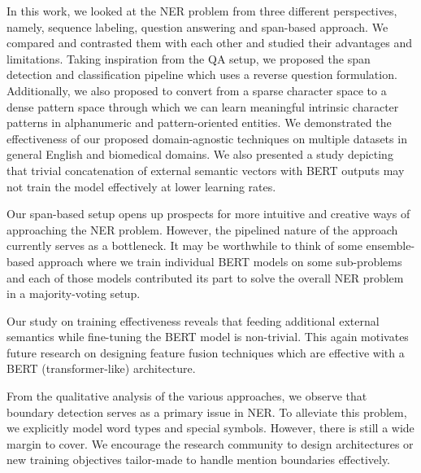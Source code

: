 In this work, we looked at the NER problem from three different perspectives, namely, sequence labeling, question answering and span-based approach. We compared and contrasted them with each other and studied their advantages and limitations. Taking inspiration from the QA setup, we proposed the span detection and classification pipeline which uses a reverse question formulation. Additionally, we also proposed to convert from a sparse character space to a dense pattern space through which we can learn meaningful intrinsic character patterns in alphanumeric and pattern-oriented entities. We demonstrated the effectiveness of our proposed domain-agnostic techniques on multiple datasets in general English and biomedical domains. We also presented a study depicting that trivial concatenation of external semantic vectors with BERT outputs may not train the model effectively at lower learning rates.

Our span-based setup opens up prospects for more intuitive and creative ways of approaching the NER problem. However, the pipelined nature of the approach currently serves as a bottleneck. It may be worthwhile to think of some ensemble-based approach where we train individual BERT models on some sub-problems and each of those models contributed its part to solve the overall NER problem in a majority-voting setup.

Our study on training effectiveness reveals that feeding additional external semantics while fine-tuning the BERT model is non-trivial. This again motivates future research on designing feature fusion techniques which are effective with a BERT (transformer-like) architecture.

From the qualitative analysis of the various approaches, we observe that boundary detection serves as a primary issue in NER. To alleviate this problem, we explicitly model word types and special symbols. However, there is still a wide margin to cover. We encourage the research community to design architectures or new training objectives tailor-made to handle mention boundaries effectively. 
